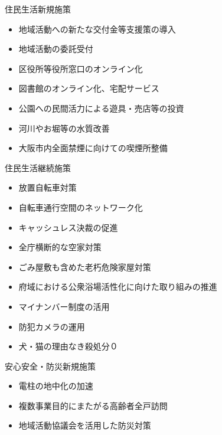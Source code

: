 \documentclass[dvipdfmx]{beamer}
\begin{document}
    \begin{frame}{住民生活}{新規施策}
        \begin{small}
            \begin{itemize}
                \setlength{\itemsep}{2mm}
                \item 地域活動への新たな交付金等支援策の導入
                \item 地域活動の委託受付
                \item 区役所等役所窓口のオンライン化
                \item 図書館のオンライン化、宅配サービス
                \item 公園への民間活力による遊具・売店等の投資
                \item \alert{河川やお堀等の水質改善}
                \item \alert{大阪市内全面禁煙に向けての喫煙所整備}
            \end{itemize}
        \end{small}
    \end{frame}

    \begin{frame}{住民生活}{継続施策}
        \begin{small}
            \begin{itemize}
                \setlength{\itemsep}{2mm}
                \item 放置自転車対策
                \item 自転車通行空間のネットワーク化
                \item キャッシュレス決裁の促進
                \item 全庁横断的な空家対策
                \item ごみ屋敷も含めた老朽危険家屋対策
                \item \alert{府域における公衆浴場活性化に向けた取り組みの推進}
                \item マイナンバー制度の活用
                \item 防犯カメラの運用
                \item 犬・猫の理由なき殺処分０
            \end{itemize}
        \end{small}
    \end{frame}

    \begin{frame}{安心安全・防災}{新規施策}
        \begin{small}
            \begin{itemize}
                \setlength{\itemsep}{5mm}
                \item 電柱の地中化の加速
                \item 複数事業目的にまたがる高齢者全戸訪問
                \item 地域活動協議会を活用した防災対策
            \end{itemize}
        \end{small}
    \end{frame}
\end{document}
